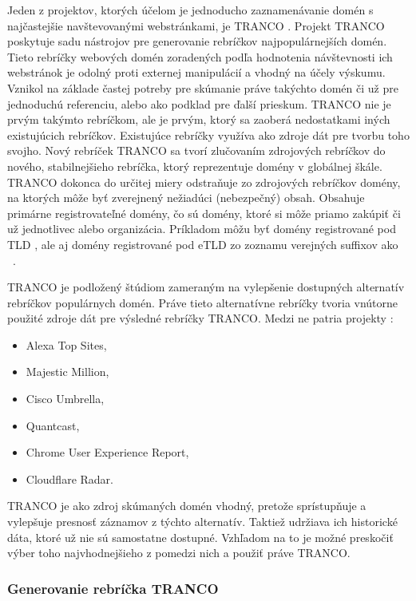 Jeden z projektov, ktorých účelom je jednoducho zaznamenávanie domén s najčastejšie navštevovanými webstránkami, je TRANCO \cite{tranco}.
Projekt TRANCO poskytuje sadu nástrojov pre generovanie rebríčkov najpopulárnejších domén. 
Tieto rebríčky webových domén zoradených podľa hodnotenia návštevnosti ich webstránok je odolný proti externej manipulácií a vhodný na účely výskumu. 
Vznikol na základe častej potreby pre skúmanie práve takýchto domén či už pre jednoduchú referenciu, alebo ako podklad pre ďalší prieskum.
TRANCO nie je prvým takýmto rebríčkom, ale je prvým, ktorý sa zaoberá nedostatkami iných existujúcich rebríčkov.
Existujúce rebríčky využíva ako zdroje dát pre tvorbu toho svojho.
Nový rebríček TRANCO sa tvorí zlučovaním zdrojových rebríčkov do nového, stabilnejšieho rebríčka, ktorý reprezentuje domény v globálnej škále.
TRANCO dokonca do určitej miery odstraňuje zo zdrojových rebríčkov domény, na ktorých môže byť zverejnený nežiadúci (nebezpečný) obsah.
Obsahuje primárne registrovateľné domény, čo sú domény, ktoré si môže priamo zakúpiť či už jednotlivec alebo organizácia. 
Príkladom môžu byť domény registrované pod TLD , ale aj domény registrované pod eTLD zo zoznamu verejných suffixov ako \mbox{ \cite{tranco}}.

\pagebreak

TRANCO je podložený štúdiom zameraným na vylepšenie dostupných alternatív rebríčkov populárnych domén.
Práve tieto alternatívne rebríčky tvoria vnútorne použité zdroje dát pre výsledné rebríčky TRANCO.
Medzi ne patria projekty \cite{tranco-config}:
\begin{itemize}
    \item Alexa Top Sites,
    \item Majestic Million,
    \item Cisco Umbrella,
    \item Quantcast,
    \item Chrome User Experience Report,
    \item Cloudflare Radar.
\end{itemize}
TRANCO je ako zdroj skúmaných domén vhodný, pretože sprístupňuje a vylepšuje presnosť záznamov z týchto alternatív.
Taktiež udržiava ich historické dáta, ktoré už nie sú samostatne dostupné.
Vzhľadom na to je možné preskočiť výber toho najvhodnejšieho z pomedzi nich a použiť práve TRANCO.

\subsubsection{Generovanie rebríčka TRANCO}
\label{tranco-generation}

